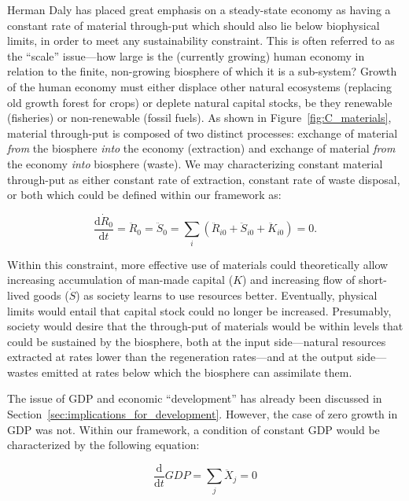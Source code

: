 Herman Daly has placed great emphasis on a steady-state
economy as having a constant rate of material through-put 
\cite{Daly1977, Daly1997}
which should also lie below biophysical limits,
in order to meet any sustainability constraint.
This is often referred to as the ``scale'' issue---how 
large is the (currently growing) human economy in relation
to the finite, non-growing biosphere of which it is a sub-system?
Growth of the human economy must either displace other natural
ecosystems (replacing old growth forest for crops)
or deplete natural capital stocks, be they 
renewable (fisheries) or 
non-renewable (fossil fuels).
As shown in Figure~\ref{fig:C_materials},
material through-put is composed of two distinct processes:
exchange of material \emph{from} the biosphere 
\emph{into} the economy (extraction)
and exchange of material \emph{from} the economy
\emph{into} biosphere (waste).
We may characterizing constant material through-put
as either constant rate of extraction, constant rate of
waste disposal, or both
which could be defined within our framework as:

\begin{equation}\label{eq:const_throughput}
	\frac{\mathrm{d}\dot{R}_{0}}{\mathrm{d}t}
	= \ddot{R}_{0}
	= \ddot{S}_{0}
	= 	\sum\limits_{i}
			\left(
				\ddot{R}_{i0}
				+ \ddot{S}_{i0}
				+ \ddot{K}_{i0}
			\right)
	= 0.
\end{equation}

Within this constraint,
more effective use of materials could
theoretically allow increasing accumulation
of man-made capital ($K$) 
and increasing flow of short-lived goods ($\dot{S}$)
as society learns to use resources better.
Eventually,
physical limits would entail that capital
stock could no longer be increased.
Presumably,
society would desire that the through-put of
materials would be within levels that could
be sustained by the biosphere,
both at the input side---natural 
resources extracted at rates lower
than the regeneration rates---and 
at the output side---wastes emitted 
at rates below which
the biosphere can assimilate them.

The issue of GDP and economic ``development'' 
has already been discussed in 
Section~\ref{sec:implications_for_development}. 
However,
the case of zero growth in GDP was not.
Within our framework,
a condition of constant GDP would be
characterized by the following equation:

\begin{equation}\label{eq:const_GDP}
	\frac{\mathrm{d}}{\mathrm{d}t}GDP
	=	\sum\limits_{j}\ddot{X}_{j}
	= 0
\end{equation}

